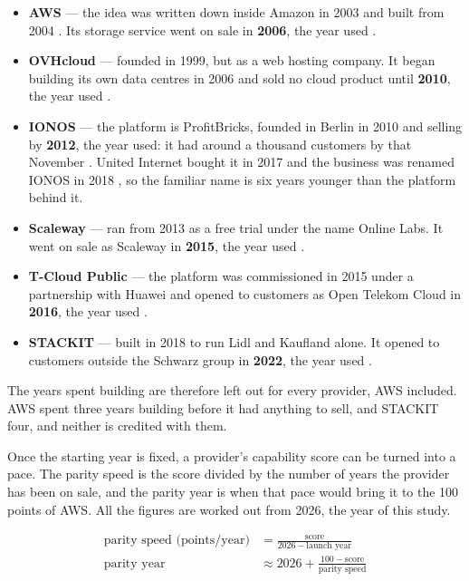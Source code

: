 \begin{itemize}
  \item \textbf{\acs{AWS}} --- the idea was written down inside Amazon in 2003
        and built from 2004 \cite{Black_EC2Origins_2009}. Its storage service
        went on sale in \textbf{2006}, the year used
        \cite{AWS_FirstFiveYears}.
  \item \textbf{OVHcloud} --- founded in 1999, but as a web hosting company. It
        began building its own data centres in 2006 and sold no cloud product
        until \textbf{2010}, the year used \cite{OVHcloud_History}.
  \item \textbf{IONOS} --- the platform is ProfitBricks, founded in Berlin in
        2010 \cite{IONOS_ProfitBricks_2018} and selling by \textbf{2012}, the
        year used: it had around a thousand customers by that November
        \cite{ProfitBricks_DCK_2012}. United Internet bought it in 2017 and the
        business was renamed IONOS in 2018
        \cite{IONOS_ProfitBricks_2018}, so the familiar name is six years
        younger than the platform behind it.
  \item \textbf{Scaleway} --- ran from 2013 as a free trial under the name
        Online Labs. It went on sale as Scaleway in \textbf{2015}, the year
        used \cite{Scaleway_About}.
  \item \textbf{T-Cloud Public} --- the platform was commissioned in 2015 under
        a partnership with Huawei and opened to customers as Open Telekom Cloud
        in \textbf{2016}, the year used \cite{OTC_GoesLive_2016}.
  \item \textbf{STACKIT} --- built in 2018 to run Lidl and Kaufland alone. It
        opened to customers outside the Schwarz group in \textbf{2022}, the year
        used \cite{STACKIT_Launch_2022}.
\end{itemize}

The years spent building are therefore left out for every provider, \acs{AWS}
included. \acs{AWS} spent three years building before it had anything to sell, and
STACKIT four, and neither is credited with them.

Once the starting year is fixed, a provider's capability score can be turned into a
pace. The parity speed is the score divided by the number of years the provider has
been on sale, and the parity year is when that pace would bring it to the 100 points
of \acs{AWS}. All the figures are worked out from 2026, the year of this study.

\begin{align}
  \label{eq:parity-speed}
  \text{parity speed (points/year)}
    &= \frac{\text{score}}{2026 - \text{launch year}} \\[0.6em]
  \label{eq:parity-year}
  \text{parity year}
    &\approx 2026 + \frac{100 - \text{score}}{\text{parity speed}}
\end{align}

